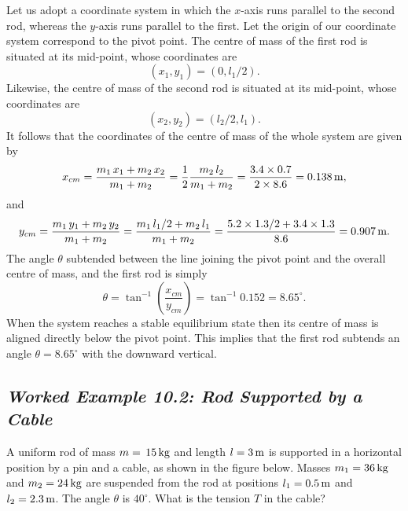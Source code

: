  Let us adopt a coordinate system in which the $x$-axis runs
parallel to the second rod, whereas the $y$-axis runs parallel to the first. Let the origin
of our coordinate system correspond to the pivot point. The centre of mass
of the first rod is situated at its mid-point, whose coordinates are
$$
(x_1, y_1) = (0, l_1/2).
$$
Likewise, the centre of mass of the second rod is situated at its mid-point, whose
coordinates are 
$$
(x_2, y_2) = (l_2/2, l_1).
$$
It follows that the coordinates of the centre of mass of the whole system are
given by
$$
x_{cm} = \frac{m_1\,x_1+ m_2\,x_2}{m_1+m_2} = \frac{1}{2} \frac{m_2\,l_2}{m_1+m_2}=
\frac{3.4\times 0.7}{2\times 8.6} = 0.138\,{\rm m},
$$
and 
$$
y_{cm} = \frac{m_1\,y_1+ m_2\,y_2}{m_1+m_2} = \frac{m_1\,l_1/2+m_2\,l_1}{m_1+m_2}
= \frac{5.2\times 1.3/2+3.4\times 1.3}{8.6} = 0.907\,{\rm m}.
$$
The angle $\theta$  subtended between the line joining the pivot point and the overall centre of mass,
and the first rod is simply
$$
\theta = \tan^{-1}\left(\frac{x_{cm}}{y_{cm}}\right) = \tan^{-1}0.152= 8.65^\circ.
$$
When the system reaches a stable equilibrium state then its centre of mass is aligned
directly below the pivot point. This implies that the first rod
subtends an angle $\theta=8.65^\circ$ with the downward vertical.

\subsection*{\em Worked Example 10.2: Rod Supported by a Cable}
 A uniform rod of mass $m=\,15\,{\rm kg}$ and
length $l=3\,{\rm m}$ is supported in a horizontal position by a
pin and a cable, as shown in the figure below. Masses $m_1=36\,{\rm kg}$
and $m_2=24\,{\rm kg}$ are suspended from the rod at positions
$l_1=0.5\,{\rm m}$ and $l_2=2.3\,{\rm m}$. The angle $\theta$ is $40^\circ$.
What is the tension $T$ in the cable?

\begin{figure*}[h]
\epsfysize=2.2in
\centerline{}
\end{figure*}

